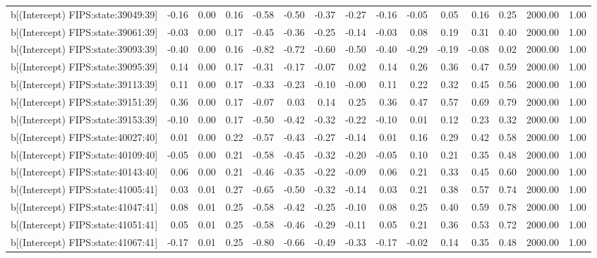 \begin{table}[ht]
\begin{tabular}{rrrrrrrrrrrrrrr}
  b[(Intercept) FIPS:state:39049:39] & -0.16 & 0.00 & 0.16 & -0.58 & -0.50 & -0.37 & -0.27 & -0.16 & -0.05 & 0.05 & 0.16 & 0.25 & 2000.00 & 1.00 \\ 
  b[(Intercept) FIPS:state:39061:39] & -0.03 & 0.00 & 0.17 & -0.45 & -0.36 & -0.25 & -0.14 & -0.03 & 0.08 & 0.19 & 0.31 & 0.40 & 2000.00 & 1.00 \\ 
  b[(Intercept) FIPS:state:39093:39] & -0.40 & 0.00 & 0.16 & -0.82 & -0.72 & -0.60 & -0.50 & -0.40 & -0.29 & -0.19 & -0.08 & 0.02 & 2000.00 & 1.00 \\ 
  b[(Intercept) FIPS:state:39095:39] & 0.14 & 0.00 & 0.17 & -0.31 & -0.17 & -0.07 & 0.02 & 0.14 & 0.26 & 0.36 & 0.47 & 0.59 & 2000.00 & 1.00 \\ 
  b[(Intercept) FIPS:state:39113:39] & 0.11 & 0.00 & 0.17 & -0.33 & -0.23 & -0.10 & -0.00 & 0.11 & 0.22 & 0.32 & 0.45 & 0.56 & 2000.00 & 1.00 \\ 
  b[(Intercept) FIPS:state:39151:39] & 0.36 & 0.00 & 0.17 & -0.07 & 0.03 & 0.14 & 0.25 & 0.36 & 0.47 & 0.57 & 0.69 & 0.79 & 2000.00 & 1.00 \\ 
  b[(Intercept) FIPS:state:39153:39] & -0.10 & 0.00 & 0.17 & -0.50 & -0.42 & -0.32 & -0.22 & -0.10 & 0.01 & 0.12 & 0.23 & 0.32 & 2000.00 & 1.00 \\ 
  b[(Intercept) FIPS:state:40027:40] & 0.01 & 0.00 & 0.22 & -0.57 & -0.43 & -0.27 & -0.14 & 0.01 & 0.16 & 0.29 & 0.42 & 0.58 & 2000.00 & 1.00 \\ 
  b[(Intercept) FIPS:state:40109:40] & -0.05 & 0.00 & 0.21 & -0.58 & -0.45 & -0.32 & -0.20 & -0.05 & 0.10 & 0.21 & 0.35 & 0.48 & 2000.00 & 1.00 \\ 
  b[(Intercept) FIPS:state:40143:40] & 0.06 & 0.00 & 0.21 & -0.46 & -0.35 & -0.22 & -0.09 & 0.06 & 0.21 & 0.33 & 0.45 & 0.60 & 2000.00 & 1.00 \\ 
  b[(Intercept) FIPS:state:41005:41] & 0.03 & 0.01 & 0.27 & -0.65 & -0.50 & -0.32 & -0.14 & 0.03 & 0.21 & 0.38 & 0.57 & 0.74 & 2000.00 & 1.00 \\ 
  b[(Intercept) FIPS:state:41047:41] & 0.08 & 0.01 & 0.25 & -0.58 & -0.42 & -0.25 & -0.10 & 0.08 & 0.25 & 0.40 & 0.59 & 0.78 & 2000.00 & 1.00 \\ 
  b[(Intercept) FIPS:state:41051:41] & 0.05 & 0.01 & 0.25 & -0.58 & -0.46 & -0.29 & -0.11 & 0.05 & 0.21 & 0.36 & 0.53 & 0.72 & 2000.00 & 1.00 \\ 
  b[(Intercept) FIPS:state:41067:41] & -0.17 & 0.01 & 0.25 & -0.80 & -0.66 & -0.49 & -0.33 & -0.17 & -0.02 & 0.14 & 0.35 & 0.48 & 2000.00 & 1.00 \\ 

\end{tabular}
\end{table}
